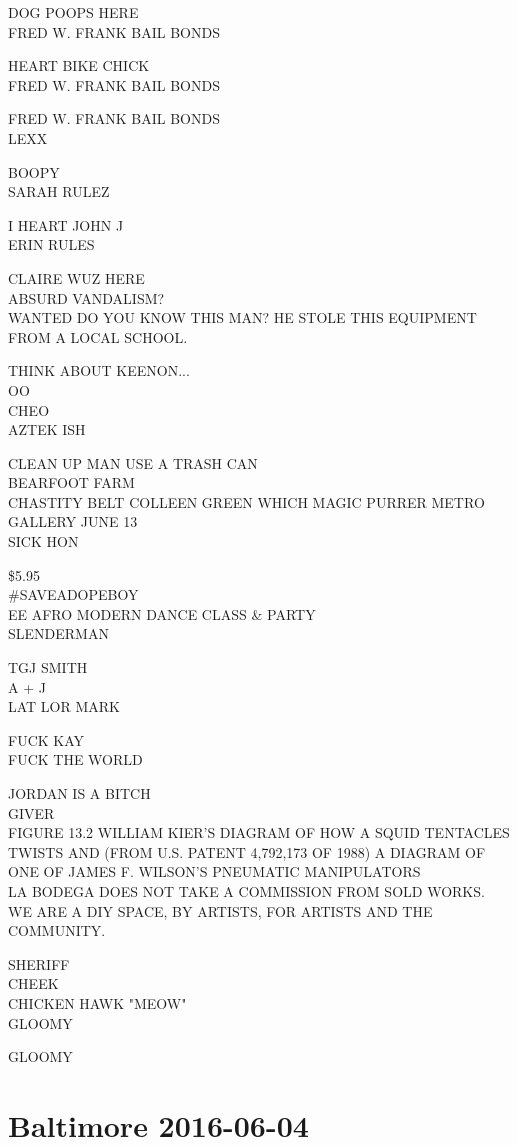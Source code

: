 \documentclass[10pt,letterpaper]{article}
\begin{document}
DOG POOPS HERE\\
FRED W. FRANK BAIL BONDS

HEART BIKE CHICK\\
FRED W. FRANK BAIL BONDS

FRED W. FRANK BAIL BONDS\\
LEXX

BOOPY\\
SARAH RULEZ

I HEART JOHN J\\
ERIN RULES

CLAIRE WUZ HERE\\
ABSURD VANDALISM?\\
WANTED DO YOU KNOW THIS MAN?  HE STOLE THIS EQUIPMENT FROM A LOCAL SCHOOL.

THINK ABOUT KEENON...\\
OO\\
CHEO\\
AZTEK ISH

CLEAN UP MAN USE A TRASH CAN\\
BEARFOOT FARM\\
CHASTITY BELT COLLEEN GREEN WHICH MAGIC PURRER METRO GALLERY JUNE 13\\
SICK HON

\$5.95\\
\#SAVEADOPEBOY\\
EE AFRO MODERN DANCE CLASS \& PARTY\\
SLENDERMAN

TGJ SMITH\\
A + J\\
LAT LOR MARK

FUCK KAY\\
FUCK THE WORLD

JORDAN IS A BITCH\\
GIVER\\
FIGURE 13.2 WILLIAM KIER'S DIAGRAM OF HOW A SQUID TENTACLES TWISTS AND (FROM U.S. PATENT 4,792,173 OF 1988) A DIAGRAM OF ONE OF JAMES F. WILSON'S PNEUMATIC MANIPULATORS\\
LA BODEGA DOES NOT TAKE A COMMISSION FROM SOLD WORKS.  WE ARE A DIY SPACE, BY ARTISTS, FOR ARTISTS AND THE COMMUNITY.

SHERIFF\\
CHEEK\\
CHICKEN HAWK "MEOW"\\
GLOOMY

GLOOMY
\

\section*{Baltimore 2016-06-04}
\end{document}
